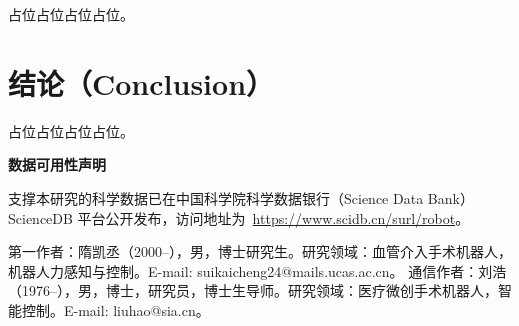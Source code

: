 \documentclass{JQRnew}
\begin{document}
占位占位占位占位。

\section{结论（Conclusion）}

占位占位占位占位。

\noindent
\textbf{数据可用性声明}

支撑本研究的科学数据已在中国科学院科学数据银行（Science Data Bank）ScienceDB 平台公开发布，访问地址为~\url{https://www.scidb.cn/surl/robot}。

\nocite{*}



\begin{AuthorIntroduction}
\Intro 第一作者：隋凯丞（2000--），男，博士研究生。研究领域：血管介入手术机器人，机器人力感知与控制。E-mail: suikaicheng24@mails.ucas.ac.cn。
\Intro 通信作者：刘浩（1976--），男，博士，研究员，博士生导师。研究领域：医疗微创手术机器人，智能控制。E-mail: liuhao@sia.cn。
\end{AuthorIntroduction}

\balance
\end{document}

